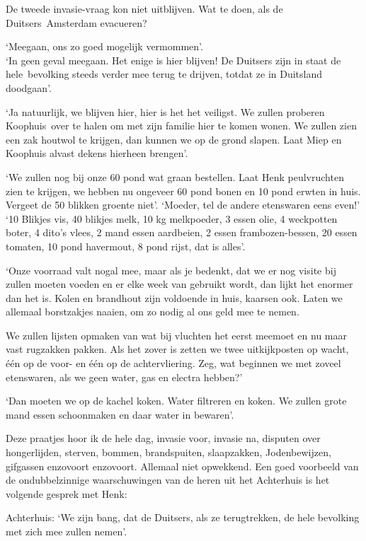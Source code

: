 \documentclass{book}
\begin{document}
De tweede invasie-vraag kon niet uitblijven. Wat te doen, als de
Duitsers~Amsterdam evacueren?

`Meegaan, ons zo goed mogelijk vermommen'.\\
`In geen geval meegaan. Het enige
is hier blijven! De Duitsers zijn in staat de hele~bevolking steeds verder mee
terug te drijven, totdat ze in Duitsland doodgaan'.

`Ja natuurlijk, we blijven hier, hier is het het veiligst. We zullen proberen
Koophuis~over te halen om met zijn familie hier te komen wonen.  We zullen zien
een zak houtwol te krijgen, dan kunnen we op de grond slapen. Laat Miep en
Koophuis alvast dekens hierheen brengen'.

`We zullen nog bij onze 60 pond wat graan bestellen. Laat Henk peulvruchten zien
te krijgen, we hebben nu ongeveer 60 pond bonen en 10 pond erwten in huis.
Vergeet de 50 blikken groente niet'. `Moeder, tel de andere etenswaren eens
even!' `10 Blikjes vis, 40 blikjes melk, 10 kg melkpoeder, 3 essen olie, 4
weckpotten boter, 4 dito's vlees, 2 mand essen aardbeien, 2 essen
frambozen-bessen, 20 essen tomaten, 10 pond havermout, 8 pond rijst, dat is
alles'.

`Onze voorraad valt nogal mee, maar als je bedenkt, dat we er nog visite bij
zullen moeten voeden en er elke week van gebruikt wordt, dan lijkt het enormer
dan het is. Kolen en brandhout zijn voldoende in huis, kaarsen ook. Laten we
allemaal borstzakjes naaien, om zo nodig al ons geld mee te nemen.

We zullen lijsten opmaken van wat bij vluchten het eerst meemoet en nu maar vast
rugzakken pakken. Als het zover is zetten we twee uitkijkposten op wacht, één op
de voor- en één op de achtervliering.  Zeg, wat beginnen we met zoveel
etenswaren, als we geen water, gas en electra hebben?'

`Dan moeten we op de kachel koken. Water filtreren en koken. We zullen grote
mand essen schoonmaken en daar water in bewaren'.

Deze praatjes hoor ik de hele dag, invasie voor, invasie na, disputen over
hongerlijden, sterven, bommen, brandspuiten, slaapzakken, Jodenbewijzen,
gifgassen enzovoort enzovoort. Allemaal niet opwekkend.  Een goed voorbeeld van
de ondubbelzinnige waarschuwingen van de heren uit het Achterhuis is het
volgende gesprek met Henk:

Achterhuis: `We zijn bang, dat de Duitsers, als ze terugtrekken, de hele
bevolking met zich mee zullen nemen'.
\end{document}
